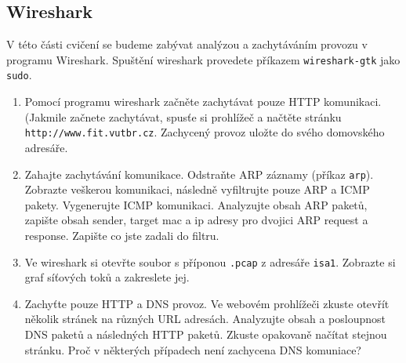 \subsection{Wireshark}
V této části cvičení se budeme zabývat analýzou a zachytáváním provozu v programu Wireshark. Spuštění wireshark provedete příkazem \texttt{wireshark-gtk} jako \texttt{sudo}.
\begin{enumerate}
\item Pomocí programu wireshark začněte zachytávat pouze HTTP komunikaci. (Jakmile začnete zachytávat, spusťe si prohlížeč a načtěte stránku \texttt{http://www.fit.vutbr.cz}. Zachycený provoz uložte do svého domovského adresáře.
\item Zahajte zachytávání komunikace. Odstraňte ARP záznamy (příkaz \texttt{arp}). Zobrazte veškerou komunikaci, následně vyfiltrujte pouze ARP a ICMP pakety. Vygenerujte ICMP komunikaci. Analyzujte obsah ARP paketů, zapište obsah sender, target mac a ip adresy pro dvojici ARP request a response. Zapište co jste zadali do filtru.
\item Ve wireshark si otevřte soubor s příponou \texttt{.pcap} z adresáře \texttt{isa1}. Zobrazte si graf síťových toků a zakreslete jej.
\item Zachyťte pouze HTTP a DNS provoz. Ve webovém prohlížeči zkuste otevřít několik stránek na různých URL adresách. Analyzujte obsah a posloupnost DNS paketů a následných HTTP paketů. Zkuste opakovaně načítat stejnou stránku. Proč v některých případech není zachycena DNS komuniace?
\end{enumerate}

